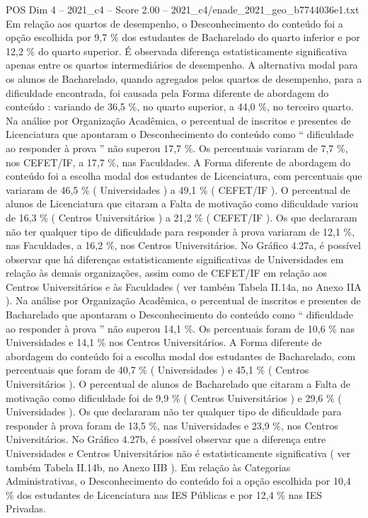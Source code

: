 \begin{textsample}{POS Dim 4 – 2021\_c4 – Score 2.00 – 2021\_c4/enade\_2021\_geo\_b7744036e1.txt}
Em relação aos quartos de desempenho, o Desconhecimento do conteúdo foi a opção escolhida por 9,7 \% dos estudantes de Bacharelado do quarto inferior e por 12,2 \% do quarto superior.
É observada diferença estatisticamente significativa apenas entre os quartos intermediários de desempenho.
A alternativa modal para os alunos de Bacharelado, quando agregados pelos quartos de desempenho, para a dificuldade encontrada, foi causada pela Forma diferente de abordagem do conteúdo : variando de 36,5 \%, no quarto superior, a 44,0 \%, no terceiro quarto.
Na análise por Organização Acadêmica, o percentual de inscritos e presentes de Licenciatura que apontaram o Desconhecimento do conteúdo como “ dificuldade ao responder à prova ” não superou 17,7 \%.
Os percentuais variaram de 7,7 \%, nos CEFET/IF, a 17,7 \%, nas Faculdades.
A Forma diferente de abordagem do conteúdo foi a escolha modal dos estudantes de Licenciatura, com percentuais que variaram de 46,5 \% ( Universidades ) a 49,1 \% ( CEFET/IF ).
O percentual de alunos de Licenciatura que citaram a Falta de motivação como dificuldade variou de 16,3 \% ( Centros Universitários ) a 21,2 \% ( CEFET/IF ).
Os que declararam não ter qualquer tipo de dificuldade para responder à prova variaram de 12,1 \%, nas Faculdades, a 16,2 \%, nos Centros Universitários.
No Gráfico 4.27a, é possível observar que há diferenças estatisticamente significativas de Universidades em relação às demais organizações, assim como de CEFET/IF em relação aos Centros Universitários e às Faculdades ( ver também Tabela II.14a, no Anexo IIA ).
Na análise por Organização Acadêmica, o percentual de inscritos e presentes de Bacharelado que apontaram o Desconhecimento do conteúdo como “ dificuldade ao responder à prova ” não superou 14,1 \%.
Os percentuais foram de 10,6 \% nas Universidades e 14,1 \% nos Centros Universitários.
A Forma diferente de abordagem do conteúdo foi a escolha modal dos estudantes de Bacharelado, com percentuais que foram de 40,7 \% ( Universidades ) e 45,1 \% ( Centros Universitários ).
O percentual de alunos de Bacharelado que citaram a Falta de motivação como dificuldade foi de 9,9 \% ( Centros Universitários ) e 29,6 \% ( Universidades ).
Os que declararam não ter qualquer tipo de dificuldade para responder à prova foram de 13,5 \%, nas Universidades e 23,9 \%, nos Centros Universitários.
No Gráfico 4.27b, é possível observar que a diferença entre Universidades e Centros Universitários não é estatisticamente significativa ( ver também Tabela II.14b, no Anexo IIB ).
Em relação às Categorias Administrativas, o Desconhecimento do conteúdo foi a opção escolhida por 10,4 \% dos estudantes de Licenciatura nas IES Públicas e por 12,4 \% nas IES Privadas.

\end{textsample}
